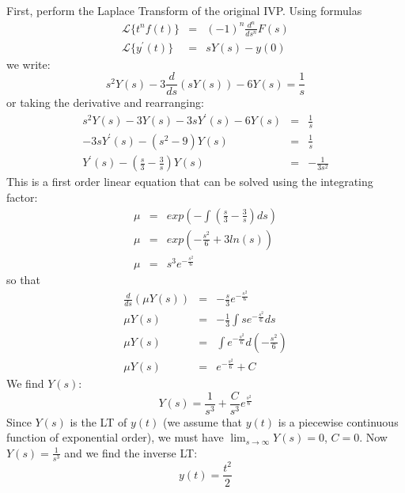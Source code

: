 \documentclass[11pt]{article}
\begin{document}
\begin{solution}

  First, perform the Laplace Transform of the original IVP. Using formulas
  \begin{eqnarray*}
    \mathcal{L}\{t^{n}f(t)\} & = & (-1)^{n}\frac{d^{n}}{ds^{n}} F(s) \\
    \mathcal{L}\{y^{\prime}(t)\} & = & sY(s) - y(0)
  \end{eqnarray*}
  we write:
  \[ s^2 Y(s) - 3 \frac {d} {ds} \left( s Y(s) \right) - 6Y(s) = \frac {1} {s} \]
  or taking the derivative and rearranging:
  \begin{eqnarray*}
    s^2 Y(s) -3 Y(s) - 3 s Y^{\prime}(s) - 6 Y(s) & = & \frac {1} {s} \\
    -3 s Y^{\prime}(s) - \left( s^2 - 9 \right) Y(s) & = & \frac {1} {s} \\
    Y^{\prime}(s) - \left( \frac {s} {3} - \frac {3} {s} \right) Y(s) & = & - \frac {1} {3 s^2}
  \end{eqnarray*}
  This is a first order linear equation that can be solved using the integrating
  factor:
  \begin{eqnarray*}
    \mu & = & exp\left( - \int \left( \frac {s} {3} - \frac {3} {s} \right) ds \right) \\
    \mu & = & exp\left( - \frac {s^2} {6} + 3 ln(s) \right) \\
    \mu & = & s^3 e^{-\frac {s^2} {6}}
  \end{eqnarray*}
  so that
  \begin{eqnarray*}
    \frac {d} {ds} \left( \mu Y(s) \right) & = & - \frac {s} {3} e^{-\frac {s^2} {6}} \\
    \mu Y(s) & = & - \frac {1} {3} \int s e^{-\frac {s^2} {6}} ds \\
    \mu Y(s) & = & \int e^{-\frac {s^2} {6}} d\left( - \frac {s^2} {6}  \right) \\
    \mu Y(s) & = & e^{-\frac {s^2} {6}} + C
  \end{eqnarray*}
  We find $Y(s)$:
  \[ Y(s) = \frac {1} {s^3} + \frac {C} {s^3} e^{\frac {s^2} {6}} \]
  Since $Y(s)$ is the LT of $y(t)$ (we assume that $y(t)$ is a 
  piecewise continuous function of exponential order), we must have
  $ \lim_{s \to \infty} Y(s) =0$, $C=0$. Now $Y(s) = \frac {1} {s^3}$ and we find
  the inverse LT:
  \begin{equation*}
    \boxed{y(t) = \frac {t^2} {2}}
  \end{equation*}
\end{solution}
\end{document}
